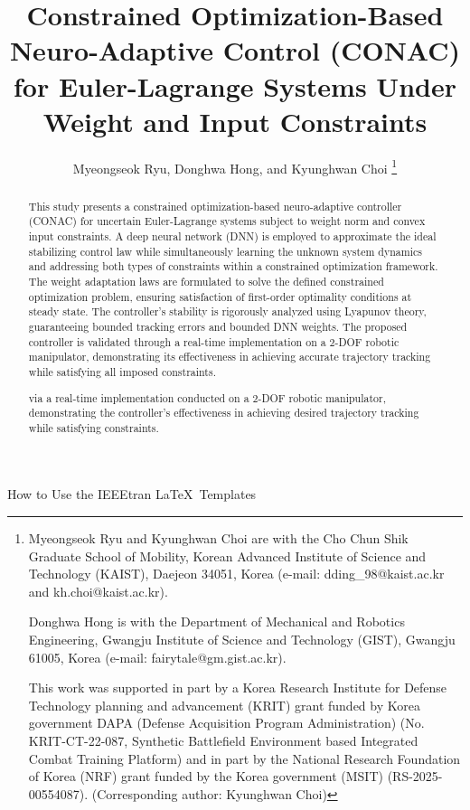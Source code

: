 \documentclass[lettersize,journal]{IEEEtran}
\begin{document}
\title{
    Constrained Optimization-Based Neuro-Adaptive Control (CONAC) for Euler-Lagrange Systems Under Weight and Input Constraints
} %

\author{
  Myeongseok Ryu, Donghwa Hong, and Kyunghwan Choi
\thanks{
    Myeongseok Ryu and Kyunghwan Choi are with the Cho Chun Shik Graduate School of Mobility, Korean Advanced Institute of Science and Technology (KAIST), Daejeon 34051, Korea (e-mail: dding\_98@kaist.ac.kr and kh.choi@kaist.ac.kr).

    Donghwa Hong is with the Department of Mechanical and Robotics Engineering, Gwangju Institute of Science and Technology (GIST), Gwangju 61005, Korea (e-mail: fairytale@gm.gist.ac.kr).

    This work was supported in part by a Korea Research Institute for Defense Technology planning and advancement (KRIT) grant funded by Korea government DAPA (Defense Acquisition Program Administration) (No. KRIT-CT-22-087, Synthetic Battlefield Environment based Integrated Combat Training Platform) and in part by the National Research Foundation of Korea (NRF) grant funded by the Korea government (MSIT) (RS-2025- 00554087). (Corresponding author: Kyunghwan Choi)
    }}

%
{How to Use the IEEEtran \LaTeX \ Templates}

\maketitle

\begin{abstract}
  This study presents a constrained optimization-based neuro-adaptive controller (CONAC) for uncertain Euler-Lagrange systems subject to weight norm and convex input constraints. 
  A deep neural network (DNN) is employed to approximate the ideal stabilizing control law while simultaneously learning the unknown system dynamics and addressing both types of constraints within a constrained optimization framework.
  The weight adaptation laws are formulated to solve the defined constrained optimization problem, ensuring satisfaction of first-order optimality conditions at steady state.
  The controller's stability is rigorously analyzed using Lyapunov theory, guaranteeing bounded tracking errors and bounded DNN weights. 
  The proposed controller is validated through a real-time implementation on a 2-DOF robotic manipulator, demonstrating its effectiveness in achieving accurate trajectory tracking while satisfying all imposed constraints.
  
  via a real-time implementation conducted on a 2-DOF robotic manipulator, demonstrating the controller's effectiveness in achieving desired trajectory tracking while satisfying constraints.
\end{abstract}
\end{document}
